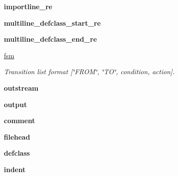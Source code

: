 \begin{DoxyCompactItemize}
\item 
\hypertarget{classmitgcm_1_1doxypy_1_1Doxypy_a211014e83bea35a97671b5c2730b074b}{{\bfseries importline\+\_\+re}}\label{classmitgcm_1_1doxypy_1_1Doxypy_a211014e83bea35a97671b5c2730b074b}

\item 
\hypertarget{classmitgcm_1_1doxypy_1_1Doxypy_a7a76c14c94f9b3f3615113a39019450d}{{\bfseries multiline\+\_\+defclass\+\_\+start\+\_\+re}}\label{classmitgcm_1_1doxypy_1_1Doxypy_a7a76c14c94f9b3f3615113a39019450d}

\item 
\hypertarget{classmitgcm_1_1doxypy_1_1Doxypy_a2d63b3f882e109a6b4238b5fff0b68f0}{{\bfseries multiline\+\_\+defclass\+\_\+end\+\_\+re}}\label{classmitgcm_1_1doxypy_1_1Doxypy_a2d63b3f882e109a6b4238b5fff0b68f0}

\item 
\hyperlink{classmitgcm_1_1doxypy_1_1Doxypy_abd7f9855188192eb916f119b7ef4a50e}{fsm}
\begin{DoxyCompactList}\small\item\em Transition list format \mbox{[}\char`\"{}\+F\+R\+O\+M\char`\"{}, \char`\"{}\+T\+O\char`\"{}, condition, action\mbox{]}. \end{DoxyCompactList}\item 
\hypertarget{classmitgcm_1_1doxypy_1_1Doxypy_a74ee547a0bcdc66fba9da1b5cc71fd21}{{\bfseries outstream}}\label{classmitgcm_1_1doxypy_1_1Doxypy_a74ee547a0bcdc66fba9da1b5cc71fd21}

\item 
\hypertarget{classmitgcm_1_1doxypy_1_1Doxypy_ad337dd7a525ee73f9f025dc75c188e0b}{{\bfseries output}}\label{classmitgcm_1_1doxypy_1_1Doxypy_ad337dd7a525ee73f9f025dc75c188e0b}

\item 
\hypertarget{classmitgcm_1_1doxypy_1_1Doxypy_a71a57e13b78afa6e78b7808b658b8585}{{\bfseries comment}}\label{classmitgcm_1_1doxypy_1_1Doxypy_a71a57e13b78afa6e78b7808b658b8585}

\item 
\hypertarget{classmitgcm_1_1doxypy_1_1Doxypy_af26f5702c399e06fb2a038e221dd1def}{{\bfseries filehead}}\label{classmitgcm_1_1doxypy_1_1Doxypy_af26f5702c399e06fb2a038e221dd1def}

\item 
\hypertarget{classmitgcm_1_1doxypy_1_1Doxypy_a0f8875b2701d11fd1f2a52bd6396ee16}{{\bfseries defclass}}\label{classmitgcm_1_1doxypy_1_1Doxypy_a0f8875b2701d11fd1f2a52bd6396ee16}

\item 
\hypertarget{classmitgcm_1_1doxypy_1_1Doxypy_aea35631c9d826cc76def5c87cfb44382}{{\bfseries indent}}\label{classmitgcm_1_1doxypy_1_1Doxypy_aea35631c9d826cc76def5c87cfb44382}

\end{DoxyCompactItemize}


